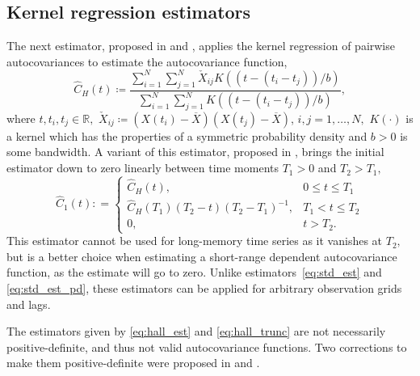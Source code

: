 \subsection{Kernel regression estimators}
The next estimator, proposed in \citet{hall1994} and \citet{hall1994_2}, applies the kernel regression of pairwise autocovariances to estimate the autocovariance function,
\begin{equation} \label{eq:hall_est}
\widehat{C}_{H}(t) \coloneq \frac{\displaystyle \sum_{i=1}^{N} \sum_{j=1}^{N}  \check{X}_{ij} K\left( \left(t - \left(t_{i} - t_{j}\right)\right) / b \right) }{\displaystyle \sum_{i=1}^{N} \sum_{j=1}^{N}  K\left( \left(t - \left(t_{i} - t_{j}\right)\right) / b \right) },
\end{equation}
where \(t, t_{i}, t_{j} \in \mathbb{R},\) \(\check{X}_{ij} \coloneq \left(X(t_{i}) - \overline{X}\right) \left(X(t_{j}) - \overline{X}\right)\), \(i, j = 1, \dots, N,\) \(K(\cdot)\) is a kernel which has the properties of a symmetric probability density and \(b > 0\) is some bandwidth.
A variant of this estimator, proposed in \cite{hall1994_2}, brings the initial estimator down to zero linearly between time moments \(T_{1} > 0\) and \(T_{2} > T_{1},\)
\begin{equation} \label{eq:hall_trunc}
    \widehat{C}_{1}(t): =
	\begin{cases}
		\widehat{C}_{H}(t), & 0 \leq t \leq T_{1} \\
		\widehat{C}_{H}\left(T_{1}\right) \left(T_{2} - t\right) \left(T_{2} - T_{1}\right)^{-1}, &  T_{1} < t \leq T_{2} \\
		0 , & t > T_{2} .
	\end{cases} 
\end{equation}  
This estimator cannot be used for long-memory time series as it vanishes at \(T_{2} ,\) but is a better choice when estimating a short-range dependent autocovariance function, as the estimate will go to zero.
Unlike estimators~\eqref{eq:std_est} and \eqref{eq:std_est_pd}, these estimators can be applied for arbitrary observation grids and lags.

The estimators given by \eqref{eq:hall_est} and \eqref{eq:hall_trunc} are not necessarily positive-definite, and thus not valid autocovariance functions. Two corrections to make them positive-definite were proposed in \citet{hall1994} and \citet{hall1994_2}.

